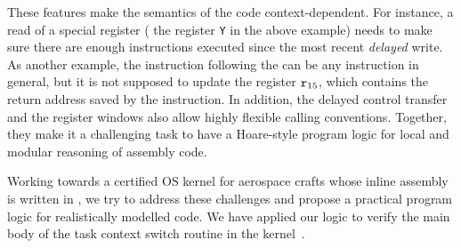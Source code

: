 These features make the semantics of the \sparc{} code
context-dependent. For instance, a read of a special register
(\eg{} the register {\tt Y} in the above example) needs to
make sure there are enough instructions executed since the
most recent {\em delayed} write. As another example,
the instruction following the \call{} can be any
instruction in general, but it is not supposed to
update the register $\texttt{r}_{15}$, which contains the return
address saved by the \call{} instruction.
In addition,
the delayed control transfer
and the register windows also allow highly flexible calling
conventions. Together, they make it a challenging task
to have a Hoare-style program logic for local and modular
reasoning of \sparc{} assembly code.

Working towards a certified OS kernel for aerospace
crafts whose inline assembly is written in \sparc,
we try to address these challenges and propose a practical
program logic for realistically modelled \sparc{} code.
We have applied our logic to verify the main body of
the task context switch routine in the kernel~\cite{zha18aplas}.

